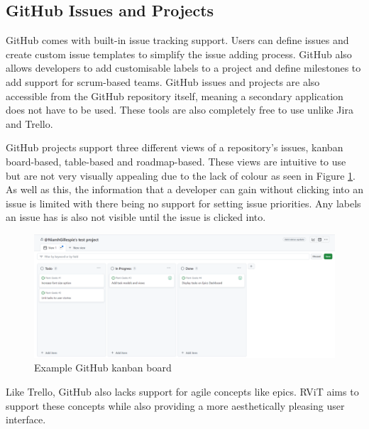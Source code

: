 \documentclass[l4proj.tex]{subfiles}
\begin{document}
\subsection{GitHub Issues and Projects}
GitHub comes with built-in issue tracking support. Users can define issues and create custom issue templates to simplify the issue adding process. GitHub also allows developers to add customisable labels to a project and define milestones to add support for scrum-based teams. GitHub issues and projects are also accessible from the GitHub repository itself, meaning a secondary application does not have to be used. These tools are also completely free to use unlike Jira and Trello.


GitHub projects support three different views of a repository's issues, kanban board-based, table-based and roadmap-based. These views are intuitive to use but are not very visually appealing due to the lack of colour as seen in Figure \ref{fig:GitHub kanban}. As well as this, the information that a developer can gain without clicking into an issue is limited with there being no support for setting issue priorities. Any labels an issue has is also not visible until the issue is clicked into.


\begin{figure}[h!]
\begin{center}
\includegraphics[scale=0.32]{dissertation/images/GitHubKanbanBoard.png}
\caption{Example GitHub kanban board}
\label{fig:GitHub kanban} 
\end{center}
\end{figure}


Like Trello, GitHub also lacks support for agile concepts like epics. RViT aims to support these concepts while also providing a more aesthetically pleasing user interface. 
\end{document}
